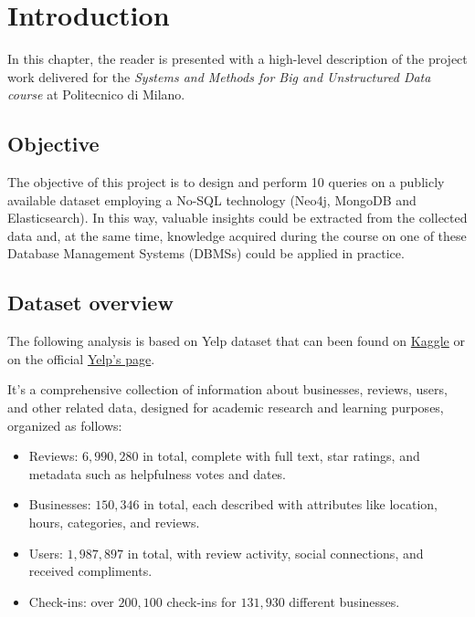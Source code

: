 \documentclass{Configuration_Files/PoliMi3i_thesis}
\begin{document}
\mainmatter %

\chapter{Introduction}
\label{ch:chapter_one}

In this chapter, the reader is presented with a high-level description of the project work delivered for the \textit{Systems and
Methods for Big and Unstructured Data course} at Politecnico di Milano.

\section{Objective}
\label{sec:Objective}
The objective of this project is to design and perform 10 queries on a publicly available dataset employing a No-SQL technology (Neo4j, MongoDB and Elasticsearch). In this way, valuable insights could be extracted from the collected data and, at the same time, knowledge acquired during the course on one of these Database Management Systems (DBMSs) could be applied in practice.

\section{Dataset overview}
The following analysis is based on Yelp dataset that can been found on \href{https://www.kaggle.com/datasets/yelp-dataset/yelp-dataset}{Kaggle} or on the official \href{https://www.yelp.com/dataset}{Yelp's page}. 

It's a comprehensive collection of information about businesses, reviews, users, and other related data, designed for academic research and learning purposes, organized as follows:
\begin{itemize}
    \item{Reviews}: $6,990,280$ in total, complete with full text, star ratings, and metadata such as helpfulness votes and dates.
    \item{Businesses}: $150,346$ in total, each described with attributes like location, hours, categories, and reviews.
    \item{Users}: $1,987,897$ in total, with review activity, social connections, and received compliments.
    \item{Check-ins}: over $200,100$ check-ins for $131,930$ different businesses.
\end{itemize}
\end{document}
